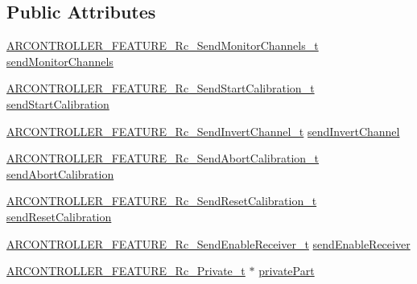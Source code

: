 \subsection*{Public Attributes}
\begin{DoxyCompactItemize}
\item 
\hyperlink{_a_r_c_o_n_t_r_o_l_l_e_r___feature_8h_a897b900e5b30e1254b7ea991f0e4fed6}{A\+R\+C\+O\+N\+T\+R\+O\+L\+L\+E\+R\+\_\+\+F\+E\+A\+T\+U\+R\+E\+\_\+\+Rc\+\_\+\+Send\+Monitor\+Channels\+\_\+t} \hyperlink{struct_a_r_c_o_n_t_r_o_l_l_e_r___f_e_a_t_u_r_e___rc__t_a2cc18588d4242ab0a2643ff9eed3e15f}{send\+Monitor\+Channels}
\item 
\hyperlink{_a_r_c_o_n_t_r_o_l_l_e_r___feature_8h_ad0bf8af872e044c48e9861c8f95b3efe}{A\+R\+C\+O\+N\+T\+R\+O\+L\+L\+E\+R\+\_\+\+F\+E\+A\+T\+U\+R\+E\+\_\+\+Rc\+\_\+\+Send\+Start\+Calibration\+\_\+t} \hyperlink{struct_a_r_c_o_n_t_r_o_l_l_e_r___f_e_a_t_u_r_e___rc__t_a99cbdb86a953966350c31d2c4e7c4665}{send\+Start\+Calibration}
\item 
\hyperlink{_a_r_c_o_n_t_r_o_l_l_e_r___feature_8h_a6058261252903eb16998ccde54890a53}{A\+R\+C\+O\+N\+T\+R\+O\+L\+L\+E\+R\+\_\+\+F\+E\+A\+T\+U\+R\+E\+\_\+\+Rc\+\_\+\+Send\+Invert\+Channel\+\_\+t} \hyperlink{struct_a_r_c_o_n_t_r_o_l_l_e_r___f_e_a_t_u_r_e___rc__t_abe3f990cabd6b45fd9195f2ae6a249ed}{send\+Invert\+Channel}
\item 
\hyperlink{_a_r_c_o_n_t_r_o_l_l_e_r___feature_8h_a89eb8891a34eccb3eebd98e72c8cca32}{A\+R\+C\+O\+N\+T\+R\+O\+L\+L\+E\+R\+\_\+\+F\+E\+A\+T\+U\+R\+E\+\_\+\+Rc\+\_\+\+Send\+Abort\+Calibration\+\_\+t} \hyperlink{struct_a_r_c_o_n_t_r_o_l_l_e_r___f_e_a_t_u_r_e___rc__t_a7ca25922534bfcbf4f37a858cf3e6ff5}{send\+Abort\+Calibration}
\item 
\hyperlink{_a_r_c_o_n_t_r_o_l_l_e_r___feature_8h_af8867d82057852ab2abf7555f58f6121}{A\+R\+C\+O\+N\+T\+R\+O\+L\+L\+E\+R\+\_\+\+F\+E\+A\+T\+U\+R\+E\+\_\+\+Rc\+\_\+\+Send\+Reset\+Calibration\+\_\+t} \hyperlink{struct_a_r_c_o_n_t_r_o_l_l_e_r___f_e_a_t_u_r_e___rc__t_af73890e682cd2ca9ae04494f8154f0ac}{send\+Reset\+Calibration}
\item 
\hyperlink{_a_r_c_o_n_t_r_o_l_l_e_r___feature_8h_ad45cecc8cf2db9c9e2cea2d5f5c5dee7}{A\+R\+C\+O\+N\+T\+R\+O\+L\+L\+E\+R\+\_\+\+F\+E\+A\+T\+U\+R\+E\+\_\+\+Rc\+\_\+\+Send\+Enable\+Receiver\+\_\+t} \hyperlink{struct_a_r_c_o_n_t_r_o_l_l_e_r___f_e_a_t_u_r_e___rc__t_a46bc20d07916ae34ac9e0f4b064c64ae}{send\+Enable\+Receiver}
\item 
\hyperlink{_a_r_c_o_n_t_r_o_l_l_e_r___feature_8h_a313e58623d8bbc4852c2a87ed54bc7f4}{A\+R\+C\+O\+N\+T\+R\+O\+L\+L\+E\+R\+\_\+\+F\+E\+A\+T\+U\+R\+E\+\_\+\+Rc\+\_\+\+Private\+\_\+t} $\ast$ \hyperlink{struct_a_r_c_o_n_t_r_o_l_l_e_r___f_e_a_t_u_r_e___rc__t_a61249f5cf7c86270d9e02c047b6e94c8}{private\+Part}
\end{DoxyCompactItemize}


